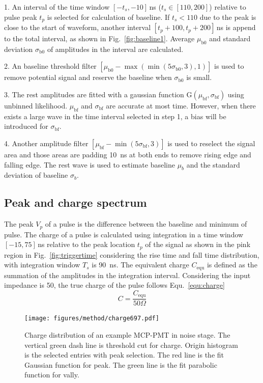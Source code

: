 1. An interval of the time window $[-t_s,-10]$\,ns ($t_s\in[110,200]$) relative to pulse peak $t_p$ is selected for calculation of baseline. If $t_s < 110$ due to the peak is close to the start of waveform, another interval $[t_p+100,t_p+200]$\,ns is append to the total interval, as shown in Fig.~\ref{fig:baseline1}. Average $\mu_{\mathrm{b0}}$ and standard deviation $\sigma_{\mathrm{b0}}$ of amplitudes in the interval are calculated.

2. An baseline threshold filter $[\mu_{\mathrm{b0}}-\max(\min(5\sigma_{\mathrm{b0}},3),1)]$ is used to remove potential signal and reserve the baseline when $\sigma_{\mathrm{b0}}$ is small.

3. The rest amplitudes are fitted with a gaussian function G$(\mu_{\mathrm{bf}},\sigma_{\mathrm{bf}})$ using unbinned likelihood. $\mu_{\mathrm{bf}}$ and $\sigma_{\mathrm{bf}}$ are accurate at most time. However, when there exists a large wave in the time interval selected in step 1, a bias will be introduced for $\sigma_{\mathrm{bf}}$.

4. Another amplitude filter $[\mu_{\mathrm{bf}}-\min(5\sigma_{\mathrm{bf}},3)]$ is used to reselect the signal area and those areas are padding \SI{10}{ns} at both ends to remove rising edge and falling edge. The rest wave is used to estimate baseline $\mu_b$ and the standard deviation of baseline $\sigma_b$.

\subsection{Peak and charge spectrum}
\label{sec:noisepeak}

The peak $V_p$ of a pulse is the difference between the baseline and minimum of pulse. The charge of a pulse is calculated using integration in a time window $[-15, 75]$\,ns relative to the peak location $t_p$ of the signal as shown in the pink region in Fig.~\ref{fig:triggertime} considering the rise time and fall time distribution, with integration window $T_s$ is \SI{90}{ns}. The equivalent charge $C_{\mathrm{equ}}$ is defined as the summation of the amplitudes in the integration interval. Considering the input impedance is \SI{50}{\Omega}, the true charge of the pulse follows Equ.~\eqref{equ:charge} 
\begin{equation}
    \label{equ:charge}
    C = \frac{C_{\mathrm{equ}}}{50 \Omega}
\end{equation}

\begin{figure}[!htbp]
    \centering
    \texttt{[image: figures/method/charge697.pdf]}
    \caption{Charge distribution of an example MCP-PMT in noise stage. The vertical green dash line is threshold cut for charge. Origin histogram is the selected entries with peak selection. The red line is the fit Gaussian function for peak. The green line is the fit parabolic function for vally.}
    \label{fig:charge}
\end{figure}

